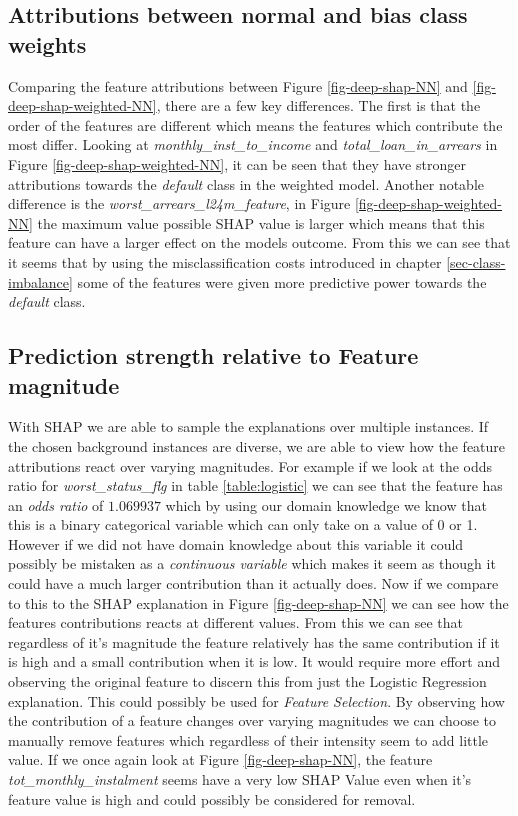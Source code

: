 \subsection{Attributions between normal and bias class weights}
Comparing the feature attributions between Figure \ref{fig-deep-shap-NN} and \ref{fig-deep-shap-weighted-NN}, there are a few key differences. The first is that the order of the features are different which means the features which contribute the most differ. Looking at \emph{monthly\_inst\_to\_income} and \emph{total\_loan\_in\_arrears} in Figure  \ref{fig-deep-shap-weighted-NN}, it can be seen that they have stronger attributions towards the \emph{default} class in the weighted model. Another notable difference is the \emph{worst\_arrears\_l24m\_feature}, in Figure \ref{fig-deep-shap-weighted-NN} the maximum value possible SHAP value is larger which means that this feature can have a larger effect on the models outcome. From this we can see that it seems that by using the misclassification costs introduced in chapter \ref{sec-class-imbalance} some of the features were given more predictive power towards the \emph{default} class.

\subsection{Prediction strength relative to Feature magnitude} \label{sect-prediction-strength}
With SHAP we are able to sample the explanations over multiple instances. If the chosen background instances are diverse, we are able to view how the feature attributions react over varying magnitudes. For example if we look at the odds ratio for \emph{worst\_status\_flg} in table \ref{table:logistic} we can see that the feature has an \emph{odds ratio} of $1.069937$ which by using our domain knowledge we know that this is a binary categorical variable which can only take on a value of 0 or 1. However if we did not have domain knowledge about this variable it could possibly be mistaken as a \emph{continuous variable} which makes it seem as though it could have a much larger contribution than it actually does. Now if we compare to this to the SHAP explanation in Figure \ref{fig-deep-shap-NN} we can see how the features contributions reacts at different values. From this we can see that regardless of it's magnitude the feature relatively has the same contribution if it is high and a small contribution when it is low. It would require more effort and observing the original feature to discern this from just the Logistic Regression explanation. This could possibly be used for \emph{Feature Selection}. By observing how the contribution of a feature changes over varying magnitudes we can choose to manually remove features which regardless of their intensity seem to add little value. If we once again look at Figure \ref{fig-deep-shap-NN}, the feature \emph{tot\_monthly\_instalment} seems have a very low SHAP Value even when it's feature value is high and could possibly be considered for removal. 
